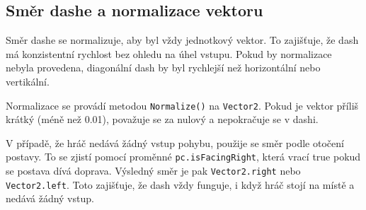 \subsection{Směr dashe a normalizace vektoru}

Směr dashe se normalizuje, aby byl vždy jednotkový vektor. To zajišťuje, že dash má konzistentní rychlost bez ohledu na úhel vstupu. Pokud by normalizace nebyla provedena, diagonální dash by byl rychlejší než horizontální nebo vertikální.

Normalizace se provádí metodou \texttt{Normalize()} na \texttt{Vector2}. Pokud je vektor příliš krátký (méně než 0.01), považuje se za nulový a nepokračuje se v dashi.

V případě, že hráč nedává žádný vstup pohybu, použije se směr podle otočení postavy. To se zjistí pomocí proměnné \texttt{pc.isFacingRight}, která vrací true pokud se postava dívá doprava. Výsledný směr je pak \texttt{Vector2.right} nebo \texttt{Vector2.left}. Toto zajišťuje, že dash vždy funguje, i když hráč stojí na místě a nedává žádný vstup.